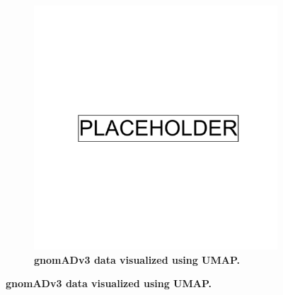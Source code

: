\clearpage

\begin{figure}[h!]
  \centering
  \begin{subfigure}[b]{0.4\linewidth}
    \includegraphics[width=\linewidth]{placeholder.png}
    \caption{\textbf{gnomADv3 data visualized using UMAP.}}
    \label{fig:gnomAD_UMAP}
  \end{subfigure}


\end{figure}
